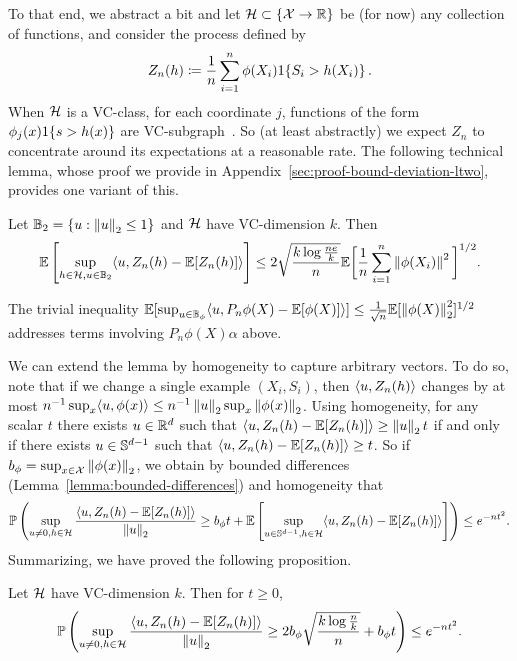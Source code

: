 \documentclass[11pt]{article}
\newcommand{\radphi}{b_{\phi}}
\newcommand{\scorefunc}{s}
\newcommand{\scoreval}{\scorefunc}
\newcommand{\scorerv}{S}
\begin{document}
To that end, we abstract a bit and let $\mathcal{H} \subset \{\mathcal{X} \to \mathbb{R}\}$ be
(for now) any collection of functions, and consider the process defined by
\begin{equation*}
  Z_n(h) \defeq \frac{1}{n}
  \sum_{i = 1}^n \phi(X_i) \indic{\scorerv_i > h(X_i)}.
\end{equation*}
%
When $\mathcal{H}$ is a VC-class, for each coordinate $j$, functions of the form
$\phi_j(x) \indic{\scoreval > h(x)}$ are VC-subgraph~\cite[Lemma
  2.6.18]{VanDerVaartWe96}.
%
So (at least abstractly) we expect $Z_n$ to concentrate around its
expectations at a reasonable rate.
%
The following technical lemma,
whose proof we provide
in Appendix~\ref{sec:proof-bound-deviation-ltwo}, provides one variant of this.
\begin{lemma}
  \label{lemma:bound-deviation-ltwo}
  Let $\mathbb{B}_2 = \{u : \left\|{u}\right\|_2 \le 1\}$
  and $\mathcal{H}$ have VC-dimension $k$.
  Then
  \begin{equation*}
    \mathbb{E}\left[\sup_{h \in \mathcal{H}, u \in \mathbb{B}_2}
      \langle u, Z_n(h) - \mathbb{E}[Z_n(h)]\rangle\right]
    \le 2 \sqrt{\frac{k \log \frac{n e}{k}}{n}}
    \mathbb{E}\bigg[\frac{1}{n} \sum_{i = 1}^n \left\|{\phi(X_i)}\right\|^2\bigg]^{1/2}.
  \end{equation*}
\end{lemma}
\noindent
The trivial inequality $\mathbb{E}[\sup_{u \in \mathbb{B}_\phi} \langle u, P_n \phi(X) -
  \mathbb{E}[\phi(X)]\rangle] \le \frac{1}{\sqrt{n}} \mathbb{E}[\left\|{\phi(X)}\right\|_2^2]^{1/2}$
addresses terms involving $P_n \phi(X) \alpha$ above.

We can extend the lemma by homogeneity to capture arbitrary vectors.
%
To do so, note that
if we change a single example $(X_i, \scorerv_i)$, then
$\langle u, Z_n(h)\rangle$ changes by at most
$n^{-1} \sup_x \langle u, \phi(x)\rangle \le n^{-1} \left\|{u}\right\|_2 \sup_x \left\|{\phi(x)}\right\|_2$.
%
Using homogeneity, for any scalar $t$ there exists $u \in \mathbb{R}^d$ such that
$\langle u, Z_n(h) - \mathbb{E}[Z_n(h)]\rangle \ge \left\|{u}\right\|_2 t$ if and only if there exists $u
\in \mathbb{S}^{d-1}$ such that $\langle u, Z_n(h) - \mathbb{E}[Z_n(h)]\rangle \ge t$.
%
So if $\radphi = \sup_{x \in \mc{X}} \ltwo{\phi(x)}$, we obtain by bounded
differences (Lemma~\ref{lemma:bounded-differences}) and homogeneity that
\begin{equation*}
  \P\left(\sup_{u \neq 0, h \in \mc{H}}
  \frac{\<u, Z_n(h) - \E[Z_n(h)]\>}{\ltwo{u}}
  \ge \radphi t
  +
  \E\left[\sup_{u \in \sphere^{d-1}, h \in \mc{H}}
    \<u, Z_n(h) - \E[Z_n(h)]\>\right]
  \right)
  \le e^{-n t^2}.
\end{equation*}
Summarizing, we have proved the following proposition.
\begin{proposition}
  \label{proposition:high-prob-deviation}
  Let $\mathcal{H}$ have VC-dimension $k$. Then for $t \ge 0$,
  \begin{equation*}
    \P\left(\sup_{u \neq 0, h \in \mc{H}}
    \frac{\<u, Z_n(h) - \E[Z_n(h)]\>}{\ltwo{u}}
    \ge 
    2 \radphi \sqrt{\frac{k \log \frac{n}{k}}{n}} + \radphi t \right)
    \le e^{-n t^2}.
  \end{equation*}
\end{proposition}
\end{document}
